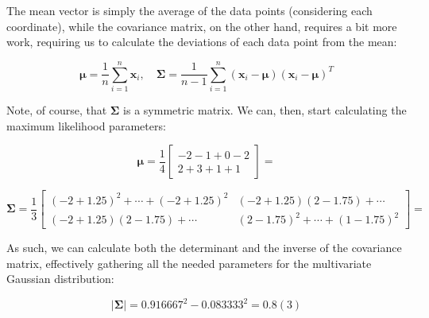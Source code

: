 \documentclass[12pt]{article}
\begin{document}
\begin{enumerate}[leftmargin=\labelsep]
\begin{enumerate}
{                The mean vector is simply the average of the data points (considering each coordinate),
                while the covariance matrix, on the other hand, requires a bit more work,
                requiring us to calculate the deviations of each data point from the mean:

                $$
                  \boldsymbol{\mu} = \frac{1}{n} \sum_{i=1}^n \boldsymbol{x}_i, \quad
                  \boldsymbol{\Sigma} = \frac{1}{n - 1} \sum_{i=1}^n (\boldsymbol{x}_i - \boldsymbol{\mu}) (\boldsymbol{x}_i - \boldsymbol{\mu})^T
                $$

                Note, of course, that $\boldsymbol{\Sigma}$ is a symmetric matrix.
                We can, then, start calculating the maximum likelihood parameters:

                $$
                  \boldsymbol{\mu} = \frac{1}{4} \begin{bmatrix}
                    -2 - 1 + 0 - 2 \\
                    2 + 3 + 1 + 1
                  \end{bmatrix} = 
                $$

                $$
                  \boldsymbol{\Sigma} = \frac{1}{3} \begin{bmatrix}
                    (-2 + 1.25)^2 + \cdots + (-2 + 1.25)^2 & (-2 + 1.25)(2 - 1.75) + \cdots       \\
                    (-2 + 1.25)(2 - 1.75) + \cdots         & (2 - 1.75)^2 + \cdots + (1 - 1.75)^2
                  \end{bmatrix} = 
                $$

                As such, we can calculate both the determinant and the inverse of the covariance matrix,
                effectively gathering all the needed parameters for the multivariate Gaussian distribution:

                $$
                  |\boldsymbol{\Sigma}| = 0.916667^2 - 0.083333^2 = 0.8(3)
                $$

}
\end{enumerate}
\end{enumerate}
\end{document}
